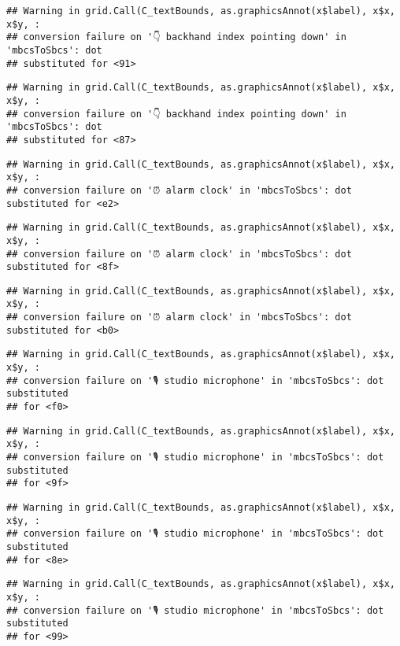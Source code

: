 \documentclass[
]{article}
\begin{document}
\begin{verbatim}
## Warning in grid.Call(C_textBounds, as.graphicsAnnot(x$label), x$x, x$y, :
## conversion failure on '👇 backhand index pointing down' in 'mbcsToSbcs': dot
## substituted for <91>
\end{verbatim}

\begin{verbatim}
## Warning in grid.Call(C_textBounds, as.graphicsAnnot(x$label), x$x, x$y, :
## conversion failure on '👇 backhand index pointing down' in 'mbcsToSbcs': dot
## substituted for <87>
\end{verbatim}

\begin{verbatim}
## Warning in grid.Call(C_textBounds, as.graphicsAnnot(x$label), x$x, x$y, :
## conversion failure on '⏰ alarm clock' in 'mbcsToSbcs': dot substituted for <e2>
\end{verbatim}

\begin{verbatim}
## Warning in grid.Call(C_textBounds, as.graphicsAnnot(x$label), x$x, x$y, :
## conversion failure on '⏰ alarm clock' in 'mbcsToSbcs': dot substituted for <8f>
\end{verbatim}

\begin{verbatim}
## Warning in grid.Call(C_textBounds, as.graphicsAnnot(x$label), x$x, x$y, :
## conversion failure on '⏰ alarm clock' in 'mbcsToSbcs': dot substituted for <b0>
\end{verbatim}

\begin{verbatim}
## Warning in grid.Call(C_textBounds, as.graphicsAnnot(x$label), x$x, x$y, :
## conversion failure on '🎙 studio microphone' in 'mbcsToSbcs': dot substituted
## for <f0>
\end{verbatim}

\begin{verbatim}
## Warning in grid.Call(C_textBounds, as.graphicsAnnot(x$label), x$x, x$y, :
## conversion failure on '🎙 studio microphone' in 'mbcsToSbcs': dot substituted
## for <9f>
\end{verbatim}

\begin{verbatim}
## Warning in grid.Call(C_textBounds, as.graphicsAnnot(x$label), x$x, x$y, :
## conversion failure on '🎙 studio microphone' in 'mbcsToSbcs': dot substituted
## for <8e>
\end{verbatim}

\begin{verbatim}
## Warning in grid.Call(C_textBounds, as.graphicsAnnot(x$label), x$x, x$y, :
## conversion failure on '🎙 studio microphone' in 'mbcsToSbcs': dot substituted
## for <99>
\end{verbatim}
\end{document}
